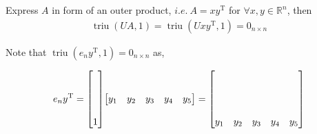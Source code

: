 \documentclass[11pt]{article}
\newcommand{\diag}{\mathop{\mathrm{diag}}}
\newcommand{\triu}{\mathop{\mathrm{triu}}}
\newcommand{\T}{\mathrm{T}}
\begin{document}
\noindent Express $A$ in form of an outer product, $i.e. \ A = xy^{\T}$ for $\forall x,y \in \mathbb{R}^{n}$, then
\begin{align*}
    \triu(UA, 1) = \triu(Uxy^{\T}, 1) = 0_{n \times n}
\end{align*}







\noindent Note that $\triu(e_{n} y^{\T}, 1) = 0_{n \times n}$ as,

\begin{align*}
    e_{n} y^{\T} = \mqty[
         \\
         \\
         \\
         \\
        1
    ]
    \mqty[
        y_{1} & y_{2} & y_{3} & y_{4} & y_{5}
    ]
    = \mqty[
          &   &   &   &  \\
          &   &   &   &  \\
          &   &   &   &  \\
          &   &   &   &  \\
        y_{1} & y_{2} & y_{3} & y_{4} & y_{5}
    ]
\end{align*}
\end{document}
